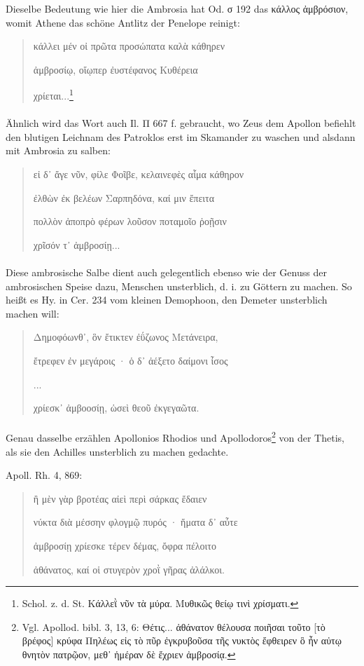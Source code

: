 \documentclass[a4paper, 11pt, oneside]{article}
\begin{document}
Dieselbe Bedeutung wie hier die Ambrosia hat Od. σ 192 das κάλλος ἀμβρόσιον, womit Athene das schöne Antlitz der Penelope reinigt:
\begin{quotation}
κάλλει μέν οἰ πρῶτα προσώπατα καλὰ κάθηρεν

ἀμβροσίῳ, οἴῳπερ ἐυστέφανος Κυθέρεια

χρίεται...\footnote{Schol. z. d. St. Κάλλεῒ νῦν τὰ μύρα. Μυθικῶς θείῳ τινὶ χρίσματι.}
\end{quotation}
\paragraph{}
Ähnlich wird das Wort auch Il. Π 667 f. gebraucht, wo Zeus dem Apollon befiehlt den blutigen Leichnam des Patroklos erst im Skamander zu waschen und alsdann mit Ambrosia zu salben:
\begin{quotation}
εἰ δ᾽ ἄγε νῦν, φίλε Φοῖβε, κελαινεφὲς αἷμα κάθηρον

ἐλθὼν ἐκ βελέων Σαρπηδόνα, καί μιν ἔπειτα

πολλὸν ἀποπρὸ φέρων λοῦσον ποταμοῖο ῥοῇσιν

χρῖσόν τ᾽ ἀμβροσίῃ...
\end{quotation}
\paragraph{}
Diese ambrosische Salbe dient auch gelegentlich ebenso wie der Genuss der ambrosischen Speise dazu, Menschen unsterblich, d. i. zu Göttern zu machen. So heißt es Hy. in Cer. 234 vom kleinen Demophoon, den Demeter unsterblich machen will:
\begin{quotation}
Δημοφόωνθ᾽, ὃν ἔτικτεν ἐΰζωνος Μετάνειρα,

ἔτρεφεν ἐν μεγάροις · ὁ δ᾽ ἀέξετο δαίμονι ἶσος

...

χρίεσκ᾽ ἀμβοοσίῃ, ὡσεὶ θεοῦ ἐκγεγαῶτα.
\end{quotation}
\paragraph{}
Genau dasselbe erzählen Apollonios Rhodios und Apollodoros\footnote{Vgl. Apollod. bibl. 3, 13, 6: Θέτις... ἀθάνατον θέλουσα ποιῆσαι τοῦτο [τὸ βρέφος] κρύφα Πηλέως εἰς τὸ πῦρ ἐγκρυβοῦσα τῆς νυκτὸς ἔφθειρεν ὃ ἦν αὐτῳ θνητὸν πατρῷον, μεθ᾽ ἡμέραν δὲ ἔχριεν ἀμβροσίᾳ.} von der Thetis, als sie den Achilles unsterblich zu machen gedachte.

Apoll. Rh. 4, 869:
\begin{quotation}
ἢ μὲν γὰρ βροτέας αἰεὶ περὶ σάρκας ἔδαιεν

νύκτα διὰ μέσσην φλογμῷ πυρός · ἥματα δ᾽ αὖτε

ἀμβροσίῃ χρίεσκε τέρεν δέμας, ὄφρα πέλοιτο

ἀθάνατος, καί οἱ στυγερὸν χροῒ γῆρας ἀλάλκοι.
\end{quotation}
\end{document}
